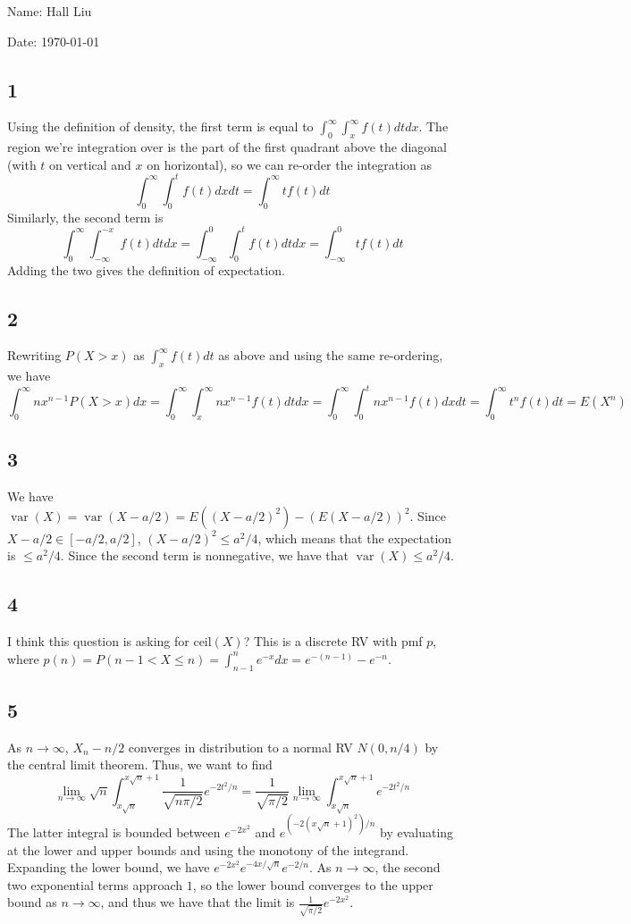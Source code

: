 \documentclass{article}
\DeclareMathOperator{\var}{var}
\begin{document}
Name: Hall Liu

Date: \today 
\vspace{1.5cm}

\subsection*{1}
Using the definition of density, the first term is equal to $\int_0^\infty\int_x^\infty f(t)dtdx$. The region we're integration over is the part of the first quadrant above the diagonal (with $t$ on vertical and $x$ on horizontal), so we can re-order the integration as
$$\int_0^\infty\int_0^tf(t)dxdt=\int_0^\infty tf(t)dt$$
Similarly, the second term is 
$$\int_0^\infty\int_{-\infty}^{-x}f(t)dtdx=\int_{-\infty}^0\int_0^tf(t)dtdx=\int_{-\infty}^0tf(t)dt$$
Adding the two gives the definition of expectation.
\subsection*{2}
Rewriting $P(X>x)$ as $\int_x^\infty f(t)dt$ as above and using the same re-ordering, we have
$$\int_0^\infty nx^{n-1}P(X>x)dx=\int_0^\infty\int_x^\infty nx^{n-1}f(t)dtdx=\int_0^\infty\int_0^tnx^{n-1}f(t)dxdt=\int_0^\infty t^nf(t)dt=E(X^n)$$
\subsection*{3}
We have $\var(X)=\var(X-a/2)=E((X-a/2)^2)-(E(X-a/2))^2$. Since $X-a/2\in[-a/2,a/2]$, $(X-a/2)^2\leq a^2/4$, which means that the expectation is $\leq a^2/4$. Since the second term is nonnegative, we have that $\var(X)\leq a^2/4$.
\subsection*{4}
I think this question is asking for $\text{ceil}(X)$? This is a discrete RV with pmf $p$, where $p(n)=P(n-1<X\leq n)=\int_{n-1}^ne^{-x}dx=e^{-(n-1)}-e^{-n}$.
\subsection*{5}
As $n\to\infty$, $X_n-n/2$ converges in distribution to a normal RV $N(0,n/4)$ by the central limit theorem. Thus, we want to find 
$$\lim_{n\to\infty}\sqrt{n}\int_{x\sqrt{n}}^{x\sqrt{n}+1}\frac{1}{\sqrt{n\pi/2}}e^{-2t^2/n}=\frac{1}{\sqrt{\pi/2}}\lim_{n\to\infty}\int_{x\sqrt{n}}^{x\sqrt{n}+1}e^{-2t^2/n}$$
The latter integral is bounded between $e^{-2x^2}$ and $e^{(-2(x\sqrt{n}+1)^2)/n}$ by evaluating at the lower and upper bounds and using the monotony of the integrand. Expanding the lower bound, we have $e^{-2x^2}e^{-4x/\sqrt{n}}e^{-2/n}$. As $n\to\infty$, the second two exponential terms approach $1$, so the lower bound converges to the upper bound as $n\to\infty$, and thus we have that the limit is $\frac{1}{\sqrt{\pi/2}}e^{-2x^2}$.
\end{document}
